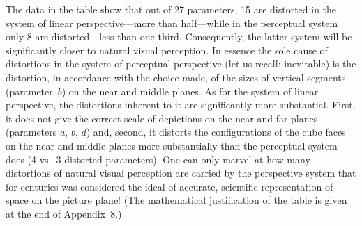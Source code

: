 \begin{center}
\end{center}

The data in the table show that out of 27 parameters, 15 are distorted in the system
of linear perspective---more than half---while in the perceptual system only 8 are
distorted---less than one third. Consequently, the latter system will be
significantly closer to natural visual perception. In essence the sole cause of
distortions in the system of perceptual perspective (let us recall: inevitable) is
the distortion, in accordance with the choice made, of the sizes of vertical segments
(parameter~$b$) on the near and middle planes. As for the system of linear
perspective, the distortions inherent to it are significantly more substantial.
First, it does not give the correct scale of depictions on the near and far planes
(parameters $a$, $b$, $d$) and, second, it distorts the configurations of the cube
faces on the near and middle planes more substantially than the perceptual system
does (4 vs.\ 3 distorted parameters). One can only marvel at how many distortions
of natural visual perception are carried by the perspective system that for centuries
was considered the ideal of accurate, scientific representation of space on the
picture plane! (The mathematical justification of the table is given at the end of
Appendix~8.)

